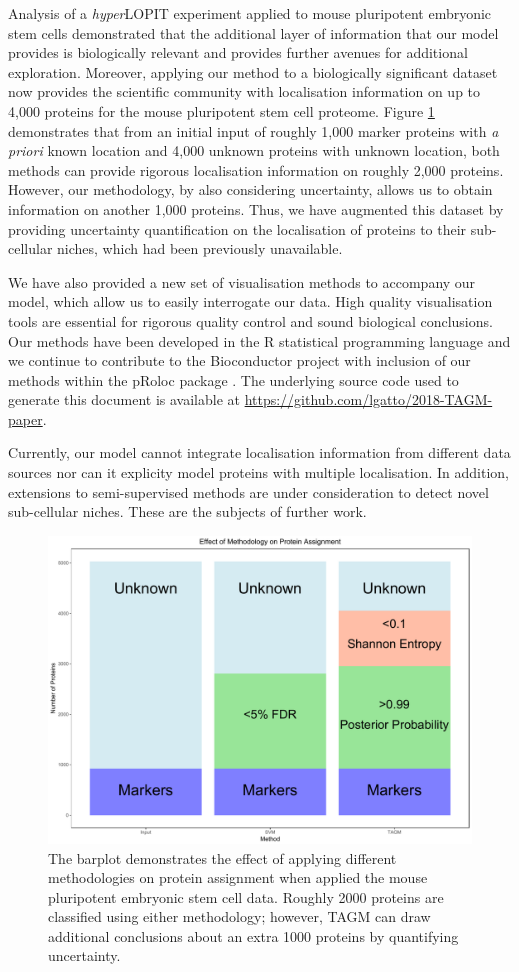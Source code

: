 \documentclass[12pt,english]{article}\usepackage[]{graphicx}\usepackage[]{color}
\begin{document}
Analysis of a \textit{hyper}LOPIT experiment applied to mouse
pluripotent embryonic stem cells demonstrated that the additional
layer of information that our model provides is biologically
relevant and provides further avenues for additional
exploration. Moreover, applying our method to a biologically
significant dataset now provides the scientific community with
localisation information on up to 4,000 proteins for the mouse
pluripotent stem cell proteome. Figure \ref{figure:ConcludePlot}
demonstrates that from an initial input of roughly 1,000 marker
proteins with \textit{a priori} known location and 4,000 unknown
proteins with unknown location, both methods can provide rigorous
localisation information on roughly 2,000 proteins. However, our
methodology, by also considering uncertainty, allows us to obtain
information on another 1,000 proteins.  Thus, we have augmented this
dataset by providing uncertainty quantification on the localisation of
proteins to their sub-cellular niches, which had been previously
unavailable.

We have also provided a new set of visualisation methods to accompany
our model, which allow us to easily interrogate our data. High quality
visualisation tools are essential for rigorous quality control and
sound biological conclusions.  Our methods have been developed in the
R statistical programming language and we continue to contribute to
the Bioconductor project \citep{Bioconductor::2004, Huber::2015} with
inclusion of our methods within the pRoloc package
\citep{pRoloc:2014}. The underlying source code used to generate this
document is available at
\url{https://github.com/lgatto/2018-TAGM-paper}.

Currently, our model cannot integrate localisation information from
different data sources nor can it explicity model proteins with
multiple localisation. In addition, extensions to semi-supervised
methods are under consideration to detect novel sub-cellular
niches. These are the subjects of further work.

\begin{figure}[h]

\centering
\includegraphics[width=.7\textwidth]{ConcludePlot.pdf}
\caption{The barplot demonstrates the effect of applying different
  methodologies on protein assignment when applied the mouse
  pluripotent embryonic stem cell data. Roughly 2000 proteins are
  classified using either methodology; however, TAGM can draw
  additional conclusions about an extra 1000 proteins by quantifying
  uncertainty.}
\label{figure:ConcludePlot}
\end{figure}
\end{document}
